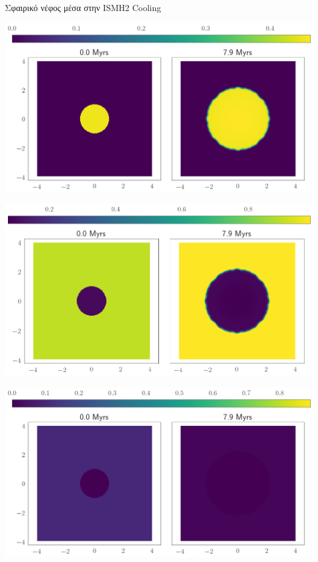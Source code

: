 \documentclass{beamer}
\begin{document}
\begin{frame}{Σφαιρικό νέφος μέσα στην ISM}{Η2 Cooling}
	\begin{center}
		\includegraphics[height=0.3\textheight]{../Document/DataImages/H2CoolingH2quad}
	\end{center}
	\begin{center}
		\includegraphics[height=0.3\textheight]{../Document/DataImages/H2CoolingHIquad}
	\end{center}
	\begin{center}
		\includegraphics[height=0.3\textheight]{../Document/DataImages/H2CoolingHIIquad}
	\end{center}
\end{frame}
\end{document}
